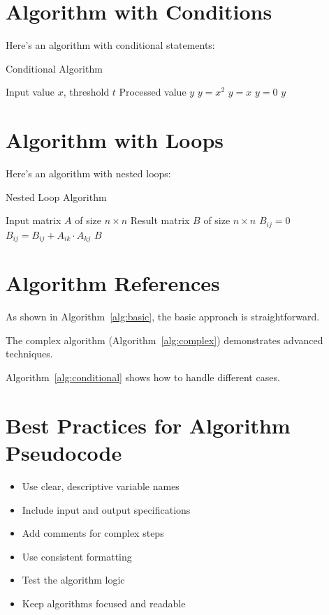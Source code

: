\documentclass{article}
\begin{document}
\section{Algorithm with Conditions}
Here's an algorithm with conditional statements:

\begin{algorithm}
\caption{Conditional Algorithm}
\label{alg:conditional}
\begin{algorithmic}[1]
\REQUIRE Input value $x$, threshold $t$
\ENSURE Processed value $y$
    \STATE $y = x^2$
    \STATE {}
    \STATE $y = x$
    \STATE {}
\ELSE
    \STATE $y = 0$
    \STATE {}
\ENDIF
\RETURN $y$
\end{algorithmic}
\end{algorithm}

\section{Algorithm with Loops}
Here's an algorithm with nested loops:

\begin{algorithm}
\caption{Nested Loop Algorithm}
\label{alg:nested}
\begin{algorithmic}[1]
\REQUIRE Input matrix $A$ of size $n \times n$
\ENSURE Result matrix $B$ of size $n \times n$
        \STATE $B_{ij} = 0$
            \STATE $B_{ij} = B_{ij} + A_{ik} \cdot A_{kj}$
        \ENDFOR
    \ENDFOR
\ENDFOR
\RETURN $B$
\end{algorithmic}
\end{algorithm}

\section{Algorithm References}
As shown in Algorithm~\ref{alg:basic}, the basic approach is straightforward.

The complex algorithm (Algorithm~\ref{alg:complex}) demonstrates advanced techniques.

Algorithm~\ref{alg:conditional} shows how to handle different cases.

\section{Best Practices for Algorithm Pseudocode}
\begin{itemize}
    \item Use clear, descriptive variable names
    \item Include input and output specifications
    \item Add comments for complex steps
    \item Use consistent formatting
    \item Test the algorithm logic
    \item Keep algorithms focused and readable
\end{itemize}
\end{document}
